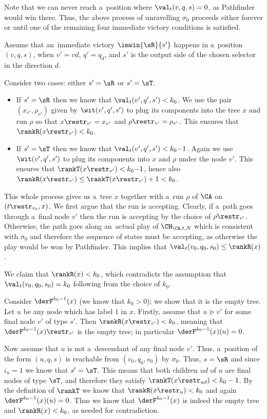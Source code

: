 Note that we can never reach a~position where $\val_t(v,q,s)=0$, as Pathfinder would win there.
Thus, the above process of unravelling $\sigma_0$ proceeds either forever or until one of the remaining four immediate victory conditions is satisfied.

Assume that an~immediate victory $\imwin{\sR}{s'}$ happens in a~position $(v,q,s)$, when $v'=vd$, $q'=q_d$, and $s'$ is the output side of the chosen selector in the direction $d$.

Consider two cases: either $s'=\sR$ or $s'=\sT$.
\begin{itemize}
\item	If $s'=\sR$ then we know that $\val_t(v',q',s')<k_0$. We use the pair $(x_{v'},\rho_{v'})$ given by $\wit(v',q',s')$ to plug its components into the tree $x$ and run $\rho$
	so that $x\restr_{v'}=x_{v'}$ and $\rho\restr_{v'}=\rho_{v'}$.
	This ensures that $\rankR(x\restr_{v'})<k_0$.
\item	If $s'=\sT$ then we know that $\val_t(v',q',s')<k_0{-}1$.
	Again we use $\wit(v',q',s')$ to plug its components into $x$ and $\rho$ under the node $v'$.
	This ensures that $\rankT(x\restr_{v'})<k_0{-}1$, hence also $\rankR(x\restr_{v'})\leq\rankT(x\restr_{v'})+1<k_0$.
\end{itemize}
\noindent %
This whole process gives us a~tree $x$ together with a~run $\rho$ of $\CA$ on $(t\restr_{v_0},x)$.
We first argue that the run is accepting.
Clearly, if a~path goes through a~final node $v'$ then the run is accepting by the choice of $\rho\restr_{v'}$.
Otherwise, the path goes along an~actual play of $\CH_{\CA,t,N}$ which is consistent with $\sigma_0$ and therefore the sequence of states must be accepting,
as otherwise the play would be won by Pathfinder.
This implies that $\val_t(v_0,q_0,s_0)\leq\rankR(x)$.

We claim that $\rankR(x)< k_0$, which contradicts the assumption that $\val_t(v_0,q_0,s_0)= k_0$ following from the choice of $k_0$.

Consider $\derF^{k_0-1}(x)$ (we know that $k_0>0$); we show that it is the empty tree.
Let $u$ be any node which has label $1$ in $x$.
Firstly, assume that $u\succeq v'$ for some final node $v'$ of type $s'$.
Then $\rankR(x\restr_{v'})<k_0$, meaning that $\derF^{k_0-1}(x)\restr_{v'}$ is the empty tree; in particular $\derF^{k_0-1}(x)(u)=0$.

Now assume that $u$ is not a~descendant of any final node $v'$.
Thus, a~position of the form $(u,q,s)$ is reachable from $(v_0,q_0,s_0)$ by $\sigma_0$.
Thus, $s=\sR$ and since $i_u=1$ we know that $s'=\sT$.
This means that both children $ud$ of $u$ are final nodes of type $\sT$, and therefore they satisfy $\rankT(x\restr_{ud})< k_0-1$.
By the definition of $\rankT$ we know that $\rankR(x\restr_u)< k_0$ and again $\derF^{k_0-1}(x)(u)=0$.
Thus we know that $\derF^{k_0-1}(x)$ is indeed the empty tree and $\rankR(x)< k_0$, as needed for contradiction.


